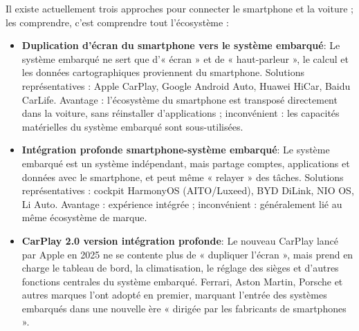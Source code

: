 


Il existe actuellement trois approches pour connecter le smartphone et la voiture ; les comprendre, c'est comprendre tout l'écosystème :

\begin{itemize}
  \item \textbf{Duplication d'écran du smartphone vers le système embarqué}: Le système embarqué ne sert que d'« écran » et de « haut-parleur », le calcul et les données cartographiques proviennent du smartphone. Solutions représentatives : Apple CarPlay, Google Android Auto, Huawei HiCar, Baidu CarLife. Avantage : l'écosystème du smartphone est transposé directement dans la voiture, sans réinstaller d'applications ; inconvénient : les capacités matérielles du système embarqué sont sous-utilisées.
  \item \textbf{Intégration profonde smartphone-système embarqué}: Le système embarqué est un système indépendant, mais partage comptes, applications et données avec le smartphone, et peut même « relayer » des tâches. Solutions représentatives : cockpit HarmonyOS (AITO/Luxeed), BYD DiLink, NIO OS, Li Auto. Avantage : expérience intégrée ; inconvénient : généralement lié au même écosystème de marque.
  \item \textbf{CarPlay 2.0 version intégration profonde}: Le nouveau CarPlay lancé par Apple en 2025 ne se contente plus de « dupliquer l'écran », mais prend en charge le tableau de bord, la climatisation, le réglage des sièges et d'autres fonctions centrales du système embarqué. Ferrari, Aston Martin, Porsche et autres marques l'ont adopté en premier, marquant l'entrée des systèmes embarqués dans une nouvelle ère « dirigée par les fabricants de smartphones ».
\end{itemize}


